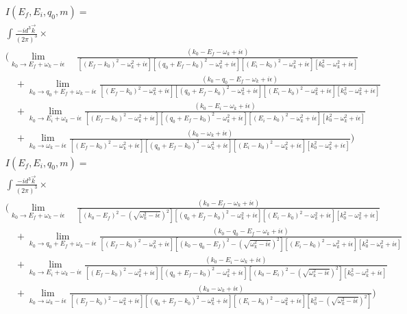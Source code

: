 \begin{align*}
&I(E_f, E_i, q_0, m) = \\
&\int \frac{-i d^3 \vec{k}}{(2\pi)^3} \times\\
&\bigg(\lim_{k_0 \to E_f + \omega_k - i \epsilon}\quad\frac{(k_0 - E_f - \omega_k + i \epsilon)}{
\left[(E_f - k_0)^2 - \omega_k^2 + i\epsilon\right]
\left[(q_0 + E_f - k_0)^2 - \omega_k^2 + i\epsilon\right]
\left[(E_i - k_0)^2 - \omega_k^2 + i\epsilon\right]
\left[k_0^2 - \omega_k^2 + i\epsilon\right]
} \\
&\quad + \lim_{k_0 \to q_0 + E_f + \omega_k - i \epsilon}\frac{(k_0 - q_0 - E_f - \omega_k + i \epsilon)}{
\left[(E_f - k_0)^2 - \omega_k^2 + i\epsilon\right]
\left[(q_0 + E_f - k_0)^2 - \omega_k^2 + i\epsilon\right]
\left[(E_i - k_0)^2 - \omega_k^2 + i\epsilon\right]
\left[k_0^2 - \omega_k^2 + i\epsilon\right]
} \\
&\quad + \lim_{k_0 \to E_i + \omega_k - i \epsilon}\frac{(k_0 - E_i - \omega_k + i \epsilon)}{
\left[(E_f - k_0)^2 - \omega_k^2 + i\epsilon\right]
\left[(q_0 + E_f - k_0)^2 - \omega_k^2 + i\epsilon\right]
\left[(E_i - k_0)^2 - \omega_k^2 + i\epsilon\right]
\left[k_0^2 - \omega_k^2 + i\epsilon\right]
} \\
&\quad + \lim_{k_0 \to \omega_k - i \epsilon}\frac{(k_0 - \omega_k + i \epsilon)}{
\left[(E_f - k_0)^2 - \omega_k^2 + i\epsilon\right]
\left[(q_0 + E_f - k_0)^2 - \omega_k^2 + i\epsilon\right]
\left[(E_i - k_0)^2 - \omega_k^2 + i\epsilon\right]
\left[k_0^2 - \omega_k^2 + i\epsilon\right]
} \bigg)
\end{align*}
\begin{align*}
&I(E_f, E_i, q_0, m) = \\
&\int \frac{-i d^3 \vec{k}}{(2\pi)^3} \times\\
&\bigg(\lim_{k_0 \to E_f + \omega_k - i \epsilon}\quad\frac{(k_0 - E_f - \omega_k + i \epsilon)}{
\left[(k_0 -E_f)^2 - (\sqrt{\omega_k^2 - i\epsilon})^2\right] %
\left[(q_0 + E_f - k_0)^2 - \omega_k^2 + i\epsilon\right]
\left[(E_i - k_0)^2 - \omega_k^2 + i\epsilon\right]
\left[k_0^2 - \omega_k^2 + i\epsilon\right]
} \\
&\quad + \lim_{k_0 \to q_0 + E_f + \omega_k - i \epsilon}\frac{(k_0 - q_0 - E_f - \omega_k + i \epsilon)}{
\left[(E_f - k_0)^2 - \omega_k^2 + i\epsilon\right]
\left[(k_0 -q_0 - E_f)^2 - (\sqrt{\omega_k^2 - i\epsilon})^2\right]%
\left[(E_i - k_0)^2 - \omega_k^2 + i\epsilon\right]
\left[k_0^2 - \omega_k^2 + i\epsilon\right]
} \\
&\quad + \lim_{k_0 \to E_i + \omega_k - i \epsilon}\frac{(k_0 - E_i - \omega_k + i \epsilon)}{
\left[(E_f - k_0)^2 - \omega_k^2 + i\epsilon\right]
\left[(q_0 + E_f - k_0)^2 - \omega_k^2 + i\epsilon\right]
\left[(k_0 - E_i)^2 - (\sqrt{\omega_k^2 - i\epsilon})^2\right]%
\left[k_0^2 - \omega_k^2 + i\epsilon\right]
} \\
&\quad + \lim_{k_0 \to \omega_k - i \epsilon}\frac{(k_0 - \omega_k + i \epsilon)}{
\left[(E_f - k_0)^2 - \omega_k^2 + i\epsilon\right]
\left[(q_0 + E_f - k_0)^2 - \omega_k^2 + i\epsilon\right]
\left[(E_i - k_0)^2 - \omega_k^2 + i\epsilon\right]
\left[k_0^2 - (\sqrt{\omega_k^2 - i\epsilon})^2\right]%
} \bigg)
\end{align*}
